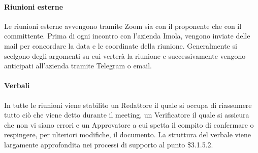 \paragraph{Riunioni esterne}
Le riunioni esterne avvengono tramite Zoom sia con il proponente che con il committente. Prima di ogni incontro con 
l'azienda Imola, vengono inviate delle mail per concordare la data e le coordinate della riunione. Generalmente si scelgono
degli argomenti su cui verterà la riunione e successivamente vengono anticipati all'azienda tramite Telegram o email.

\paragraph{Verbali}
In tutte le riunioni viene stabilito un Redattore il quale si occupa di riassumere tutto ciò che
viene detto durante il meeting, un Verificatore il quale si assicura che non vi siano errori e un Approvatore
a cui spetta il compito di confermare o respingere, per ulteriori modifiche, il documento. La struttura del verbale viene 
largamente approfondita nei processi di supporto al punto \$3.1.5.2.